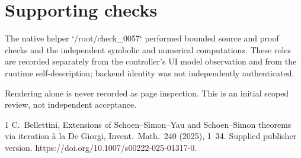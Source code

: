 \documentclass[10pt]{article}
\begin{document}
\section*{Supporting checks}
The native helper `/root/check\_0057` performed bounded source and proof checks and the independent symbolic and numerical computations. These roles are recorded separately from the controller’s UI model observation and from the runtime self-description; backend identity was not independently authenticated.\par
Rendering alone is never recorded as page inspection. This is an initial scoped review, not independent acceptance.\par
1 C. Bellettini, Extensions of Schoen–Simon–Yau and Schoen–Simon theorems via iteration à la De Giorgi, Invent. Math. 240 (2025), 1–34. Supplied publisher version. https://doi.org/10.1007/s00222-025-01317-0.\par
\end{document}
